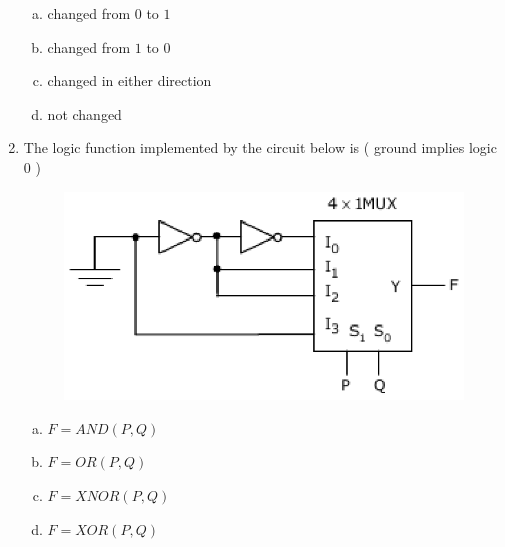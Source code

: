 \documentclass[journal,12pt,twocolumn]{IEEEtran}
\begin{document}
\begin{enumerate}
\begin{figure}
\label{fig:41}

\end{figure} 


\begin{enumerate}[(a)]

\item changed from $0$ to $1$

\item changed from $1$ to $0$

\item changed in either direction

\item not changed 

\end{enumerate}

\item The logic function implemented by the circuit below is ( ground implies logic $0$ )

\begin{figure}

\centering

\includegraphics[width=\columnwidth]{./figs/48.eps}

\caption{}

\label{fig:42}

\end{figure} 



\begin{enumerate}[(a)]

\item $ F = AND(P,Q) $

\item $ F = OR(P,Q) $

\item $ F = XNOR(P,Q) $

\item $ F = XOR(P,Q) $


\end{enumerate}
\end{enumerate}
\end{document}

